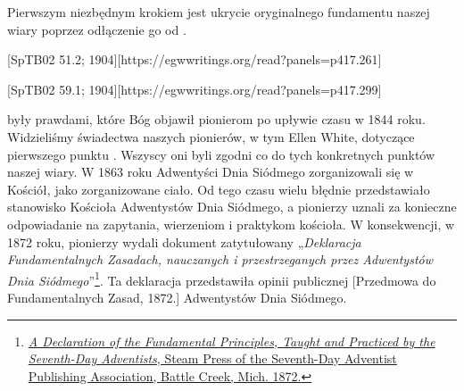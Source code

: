 Pierwszym niezbędnym krokiem jest ukrycie oryginalnego fundamentu naszej wiary poprzez odłączenie go od .

[SpTB02 51.2; 1904][https://egwwritings.org/read?panels=p417.261]

[SpTB02 59.1; 1904][https://egwwritings.org/read?panels=p417.299]

 były prawdami, które Bóg objawił pionierom po upływie czasu w 1844 roku. Widzieliśmy świadectwa naszych pionierów, w tym Ellen White, dotyczące pierwszego punktu . Wszyscy oni byli zgodni co do tych konkretnych punktów naszej wiary. W 1863 roku Adwentyści Dnia Siódmego zorganizowali się w Kościół, jako zorganizowane ciało. Od tego czasu wielu błędnie przedstawiało stanowisko Kościoła Adwentystów Dnia Siódmego, a pionierzy uznali za konieczne odpowiadanie na zapytania,  wierzeniom i praktykom kościoła. W konsekwencji, w 1872 roku, pionierzy wydali dokument zatytułowany „\textit{Deklaracja Fundamentalnych Zasadach, nauczanych i przestrzeganych przez Adwentystów Dnia Siódmego}”\footnote{\href{https://archive.org/details/ADeclarationOfTheFundamentalPrinciplesTaughtAndPracticedByThe}{\textit{A Declaration of the Fundamental Principles, Taught and Practiced by the Seventh-Day Adventists}, Steam Press of the Seventh-Day Adventist Publishing Association, Battle Creek, Mich. 1872.}}. Ta deklaracja przedstawiła opinii publicznej [Przedmowa do Fundamentalnych Zasad, 1872.] Adwentystów Dnia Siódmego.

